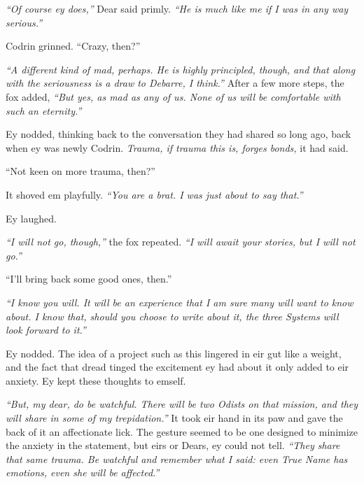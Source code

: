 \emph{``Of course ey does,''} Dear said primly. \emph{``He is much like me if I was in any way serious.''}

Codrin grinned. ``Crazy, then?''

\emph{``A different kind of mad, perhaps. He is highly principled, though, and that along with the seriousness is a draw to Debarre, I think.''} After a few more steps, the fox added, \emph{``But yes, as mad as any of us. None of us will be comfortable with such an eternity.''}

Ey nodded, thinking back to the conversation they had shared so long ago, back when ey was newly Codrin. \emph{Trauma, if trauma this is, forges bonds,} it had said.

``Not keen on more trauma, then?''

It shoved em playfully. \emph{``You are a brat. I was just about to say that.''}

Ey laughed.

\emph{``I will not go, though,''} the fox repeated. \emph{``I will await your stories, but I will not go.''}

``I'll bring back some good ones, then.''

\emph{``I know you will. It will be an experience that I am sure many will want to know about. I know that, should you choose to write about it, the three Systems will look forward to it.''}

Ey nodded. The idea of a project such as this lingered in eir gut like a weight, and the fact that dread tinged the excitement ey had about it only added to eir anxiety. Ey kept these thoughts to emself.

\emph{``But, my dear, do be watchful. There will be two Odists on that mission, and they will share in some of my trepidation.''} It took eir hand in its paw and gave the back of it an affectionate lick. The gesture seemed to be one designed to minimize the anxiety in the statement, but eirs or Dears, ey could not tell. \emph{``They share that same trauma. Be watchful and remember what I said: even True Name has emotions, even she will be affected.''}
